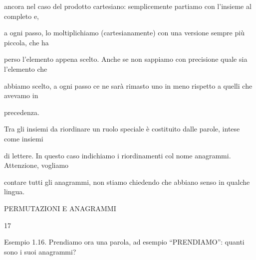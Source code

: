\documentclass[a4paper,portrait,12pt]{article}
\begin{document}
\begin{flushleft}
ancora nel caso del prodotto cartesiano: semplicemente partiamo con l'insieme al completo e,
\end{flushleft}


\begin{flushleft}
a ogni passo, lo moltiplichiamo (cartesianamente) con una versione sempre più piccola, che ha
\end{flushleft}


\begin{flushleft}
perso l'elemento appena scelto. Anche se non sappiamo con precisione quale sia l'elemento che
\end{flushleft}


\begin{flushleft}
abbiamo scelto, a ogni passo ce ne sar\`{a} rimasto uno in meno rispetto a quelli che avevamo in
\end{flushleft}


\begin{flushleft}
precedenza.
\end{flushleft}


\begin{flushleft}
Tra gli insiemi da riordinare un ruolo speciale \`{e} costituito dalle parole, intese come insiemi
\end{flushleft}


\begin{flushleft}
di lettere. In questo caso indichiamo i riordinamenti col nome anagrammi. Attenzione, vogliamo
\end{flushleft}


\begin{flushleft}
contare tutti gli anagrammi, non stiamo chiedendo che abbiano senso in qualche lingua.
\end{flushleft}





\begin{flushleft}
 PERMUTAZIONI E ANAGRAMMI
\end{flushleft}





17





\begin{flushleft}
Esempio 1.16. Prendiamo ora una parola, ad esempio ``PRENDIAMO'': quanti sono i suoi anagrammi?
\end{flushleft}
\end{document}
